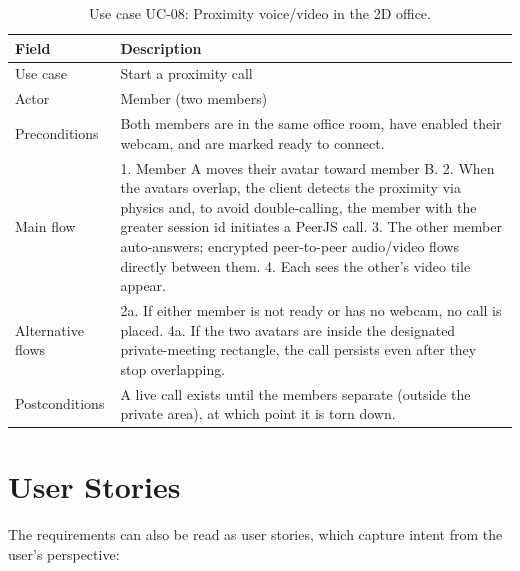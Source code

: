 \begin{table}[htbp]
\centering
\caption{Use case UC-08: Proximity voice/video in the 2D office.}
\label{tab:uc-prox}
\small
\begin{tabularx}{\textwidth}{L{3.0cm} X}
\toprule
\textbf{Field} & \textbf{Description} \\
\midrule
Use case & Start a proximity call \\
Actor & Member (two members) \\
Preconditions & Both members are in the same office room, have enabled their webcam, and are marked ready to connect. \\
Main flow &
1. Member A moves their avatar toward member B.
2. When the avatars overlap, the client detects the proximity via physics and, to avoid double-calling, the member with the greater session id initiates a PeerJS call.
3. The other member auto-answers; encrypted peer-to-peer audio/video flows directly between them.
4. Each sees the other's video tile appear. \\
Alternative flows &
2a. If either member is not ready or has no webcam, no call is placed.
4a. If the two avatars are inside the designated private-meeting rectangle, the call persists even after they stop overlapping. \\
Postconditions & A live call exists until the members separate (outside the private area), at which point it is torn down. \\
\bottomrule
\end{tabularx}
\end{table}

\section{User Stories}
\label{sec:userstories}

The requirements can also be read as user stories, which capture intent from the
user's perspective:

